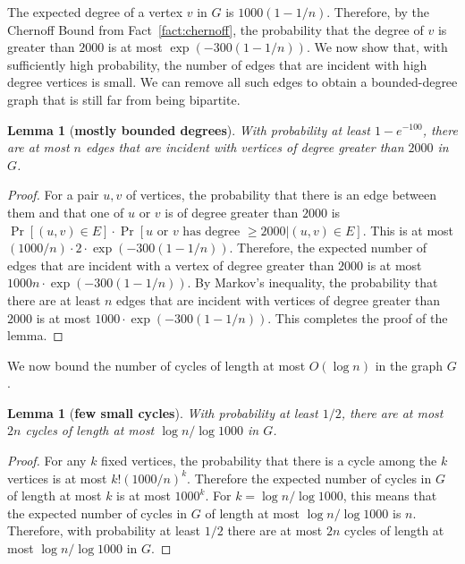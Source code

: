 \documentclass[11pt]{article}
\newtheorem{lemma}[theorem]{Lemma}
\begin{document}
The expected degree of a vertex $v$ in $G$ is $1000(1-1/n)$. Therefore, by the Chernoff Bound from Fact~\ref{fact:chernoff}, the
probability that the degree of $v$ is greater than $2000$ is at most $\exp( -300(1-1/n))$.  We now
show that, with sufficiently high probability, the number of edges that are incident with high
degree vertices is small. We can remove all such edges to obtain a bounded-degree graph that is
still far from being bipartite.

\begin{lemma}[\textbf{mostly bounded degrees}]
  With probability at least $1 - e^{-100}$, there are at most $n$ edges that are incident with
  vertices of degree greater than $2000$ in $G$.
  \label{lem:edges-high-degre}
\end{lemma}
\begin{proof}
  For a pair $u,v$ of vertices, the probability that there is an edge between them and that one of
  $u$ or $v$ is of degree greater than $2000$ is $\Pr[(u,v)\in E]\cdot\Pr[u \text{ or } v \text{ has
  degree }\ge 2000|(u,v)\in E]$. This is at most $(1000/n)\cdot 2\cdot \exp( -300(1-1/n))$.
  Therefore, the expected number of edges that are incident with a vertex of degree greater
  than $2000$ is at most $1000n\cdot \exp( -300(1-1/n))$.  By Markov's inequality, the probability
  that there are at least $n$ edges that are incident with vertices of degree greater than $2000$ is at
  most $1000\cdot \exp( -300(1-1/n))$. This completes the proof of the lemma.
\end{proof}

We now bound the number of cycles of length at most $O(\log n)$ in the graph $G$.
\begin{lemma}[\textbf{few small cycles}]
  With probability at least $1/2$, there are at most $2n$ cycles of length at most $\log n/\log
  1000$ in $G$.
  \label{lem:cycles}
\end{lemma}
\begin{proof}
  For any $k$ fixed vertices, the probability that there is a cycle among the $k$ vertices is at
  most $k!(1000/n)^k$.  Therefore the expected number of cycles in $G$ of length at most $k$ is at
  most $1000^k$. For $k=\log n/\log 1000$, this means that the expected number of cycles in $G$ of
  length at most $\log n/\log 1000$ is $n$. Therefore, with probability at least $1/2$ there are at
  most $2n$ cycles of length at most $\log n/\log 1000$ in $G$.
\end{proof}
\end{document}
